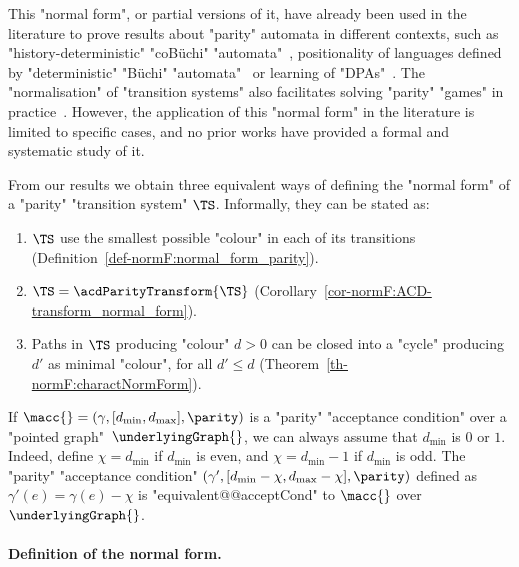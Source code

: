 \documentclass[10pt,a4paper]{amsart}
\renewcommand{\gg}{\gamma}
\begin{document}
This "normal form", or partial versions of it, have already been used in the literature to prove results about "parity" automata in different contexts, such as "history-deterministic" "coB\"uchi" "automata"~\cite{AK22MinimizingGFG,EhlersSchewe22NaturalColors,KS15DeterminisationGFG}, positionality of languages defined by "deterministic" "B\"uchi" "automata"~\cite{BCRV22HalfPosBuchi} or learning of "DPAs"~\cite{BohnLoding23DetParityFromExamples}. The "normalisation" of "transition systems" also facilitates solving "parity" "games" in practice~\cite{FriedmannM09ParityGames}.
However, the application of this "normal form" in the literature is limited to specific cases, and no prior works have provided a formal and systematic study of it.

From our results we obtain three equivalent ways of defining the "normal form" of a "parity" "transition system" $\TS$. Informally, they can be stated as:
\begin{enumerate}
	\item $\TS$ use the smallest possible "colour" in each of its transitions (Definition~\ref{def-normF:normal_form_parity}).
	\item $\TS = \acdParityTransform{\TS}$ (Corollary~\ref{cor-normF:ACD-transform_normal_form}).
	\item Paths in $\TS$ producing "colour" $d>0$ can be closed into a "cycle" producing $d'$ as minimal "colour", for all $d'\leq d$ (Theorem~\ref{th-normF:charactNormForm}).
\end{enumerate}



\begin{remark}
	If $\macc{} = (\gg, [d_{\min}, d_{\max}], \parity)$ is a "parity" "acceptance condition" over a "pointed graph"~$\underlyingGraph{}$, we can always assume that $d_{\min}$ is $0$ or $1$. Indeed, define $\chi = d_{\min}$ if $d_{\min}$ is even, and $\chi = d_{\min} - 1$ if  $d_{\min}$ is odd. The "parity" "acceptance condition" $(\gg', [d_{\min} - \chi, d_{\max} - \chi], \parity)$ defined as $\gg'(e) = \gg(e) - \chi$ is "equivalent@@acceptCond" to $\macc{}$ over $\underlyingGraph{}$.
\end{remark}


\paragraph*{Definition of the normal form.}
\end{document}

